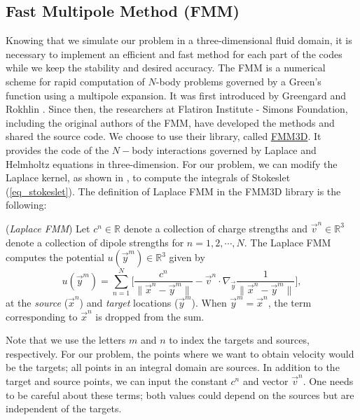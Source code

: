 \subsection{Fast Multipole Method (FMM)}
\label{subsec:FMM}
Knowing that we simulate our problem in a three-dimensional fluid domain, it is necessary to implement an efficient and fast method for each part of the codes while we keep the stability and desired accuracy. 
The FMM is a numerical scheme for rapid computation of $N$-body problems governed by a Green's function using a multipole expansion. It was first introduced by Greengard and Rokhlin \cite{greengard_fast_1987}. Since then, the researchers at Flatiron Institute - Simons Foundation,  including the original authors of the FMM, have developed the methods and shared the source code. \cite{cheng_fast_1999,greengard_new_1997,greengard_new_2002} We choose to use their library, called \href{https://github.com/flatironinstitute/FMM3D}{{\color{blue}FMM3D}}. It provides the code of the $N-$body interactions governed by Laplace and Helmholtz equations in three-dimension.
For our problem, we can modify the Laplace kernel, as shown in \cite{tornberg_fast_2008}, to compute the integrals of Stokeslet (\ref{eq_stokeslet}).
The definition of Laplace FMM in the FMM3D library is the following:
\begin{definition} (\textit{Laplace FMM})
	\label{eq_def_FMM}
	Let $c^n \in \mathbb{R}$ denote a collection of charge strengths and $\vec{v}^n \in \mathbb{R}^3$ denote a collection of dipole strengths for $n = 1,2, \cdots, N$.
	The Laplace FMM computes the potential $u(\vec{y}^m) \in \mathbb{R}^3$ given by
\begin{equation}
	u(\vec{y}^m) = \sum_{n = 1}^{N} 
		\Biggl[
		\frac{c^n}{\|\vec{x}^n - \vec{y}^m \|}
			- \vec{v}^n \cdot \nabla_{\vec{y}} 
			 \frac{1}{\|\vec{x}^n - \vec{y}^m \|}
		\Biggr],
\label{eq_fmm3d_package}
\end{equation}
	at the \textit{source} ($\vec{x}^n$) and \textit{target} locations ($\vec{y}^m$). 
	When $\vec{y}^m = \vec{x}^n$, the term corresponding to $\vec{x}^n$
	is dropped from the sum.
\end{definition}
\noindent
Note that we use the letters $m$ and $n$ to index the targets and sources, respectively. For our problem, the points where we want to obtain velocity would be the targets; all points in an integral domain are sources.
In addition to the target and source points, we can input the constant $c^n$ and vector $\vec{v}^{n}$. One needs to be careful about these terms; both values could depend on the sources but are independent of the targets. 
